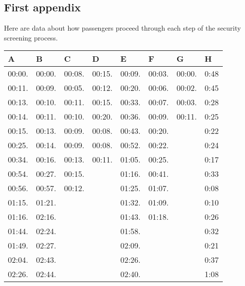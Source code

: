 \documentclass{mcmthesis}
\begin{document}
	\begin{appendices}
		
		\section{First appendix}
		Here are data  about how passengers proceed through each step of the security screening process. \\
		\begin{table}[htbp]
			\centering
			\begin{tabular}{m{1.3cm}<{\centering}m{1.3cm}<{\centering}m{1.3cm}<{\centering}m{1.3cm}<{\centering}m{1.3cm}<{\centering}m{1.3cm}<{\centering}m{1.3cm}<{\centering}m{1.3cm}<{\centering}}
				\toprule
				\textbf{A}&\textbf{B}&\textbf{C}&\textbf{D}&\textbf{E}&\textbf{F}&\textbf{G}&\textbf{H}\\
				\midrule					
				00:00.&	00:00.&	00:08.&	00:15.&	00:09.&	00:03.&	00:00.&	0:48\\
				00:11.&	00:09.&	00:05.&	00:12.&	00:20.&	00:06.&	00:02.&	0:45\\
				00:13.&	00:10.&	00:11.&	00:15.&	00:33.&	00:07.&	00:03.&	0:28\\
				00:14.&	00:11.&	00:10.&	00:20.&	00:36.&	00:09.&	00:11.&	0:25\\
				00:15.&	00:13.&	00:09.&	00:08.&	00:43.&	00:20.&		&	0:22\\
				00:25.&	00:14.&	00:09.&	00:08.&	00:52.&	00:22.&		&	0:24\\
				00:34.&	00:16.&	00:13.&	00:11.&	01:05.&	00:25.&		&	0:17\\
				00:54.&	00:27.&	00:15.&		&	01:16.&	00:41.&		&	0:33\\
				00:56.&	00:57.&	00:12.&		&	01:25.&	01:07.&		&	0:08\\
				01:15.&	01:21.&		&		&	01:32.&	01:09.&		&	0:10\\
				01:16.&	02:16.&		&		&	01:43.&	01:18.&		&	0:26\\
				01:44.&	02:24.&		&		&	01:58.&		&		&	0:32\\
				01:49.&	02:27.&		&		&	02:09.&		&		&	0:21\\
				02:04.&	02:43.&		&		&	02:26.&		&		&	0:37\\
				02:26.&	02:44.&		&		&	02:40.&		&		&	1:08\\
				

\end{tabular}
\end{table}
\end{appendices}
\end{document}
